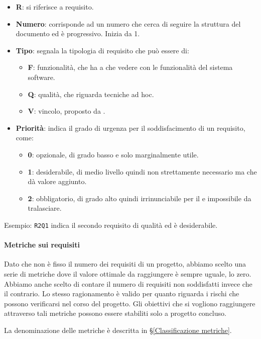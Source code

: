 		\begin{itemize}
			\item \textbf{R}: si riferisce a requisito.
		 	\item \textbf{Numero}: corrisponde ad un numero che cerca di seguire la struttura del documento ed è progressivo. Inizia da 1.
		 	\item \textbf{Tipo}: segnala la tipologia di requisito che può essere di:
		 	\begin{itemize}
		 		\item \textbf{F}: funzionalità, che ha a che vedere con le funzionalità del sistema software.
		 		\item \textbf{Q}: qualità, che riguarda tecniche ad hoc.
		 		\item \textbf{V}: vincolo, proposto da \II.
		 	\end{itemize}
	 		\item \textbf{Priorità}: indica il grado di urgenza per il soddisfacimento di un requisito, come:
	 		\begin{itemize}
	 			\item \textbf{0}: opzionale, di grado basso e solo marginalmente utile.
	 			\item \textbf{1}: desiderabile, di medio livello quindi non strettamente necessario ma che dà valore aggiunto.
	 			\item \textbf{2}: obbligatorio, di grado alto quindi irrinunciabile per il  e impossibile da tralasciare.
	 		\end{itemize}
		\end{itemize}

		Esempio: \texttt{R2Q1} indica il secondo requisito di qualità ed è desiderabile.


		\paragraph{Metriche sui requisiti}\label{MetricheAdR}
		Dato che non è fisso il numero dei requisiti di un progetto, abbiamo scelto una serie di metriche dove il valore ottimale da raggiungere è sempre uguale, lo zero. Abbiamo anche scelto di contare il numero di requisiti non soddisfatti invece che il contrario. Lo stesso ragionamento è valido per quanto	riguarda i rischi che possono verificarsi nel corso del progetto.
		Gli obiettivi che si vogliono raggiungere attraverso tali metriche possono essere stabiliti solo a progetto concluso.

		La denominazione delle metriche è descritta in \S\ref{Classificazione metriche}.

